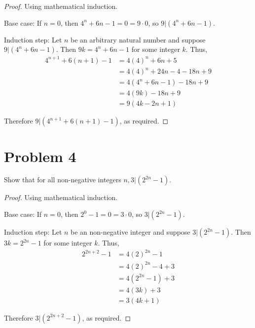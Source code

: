 \documentclass{article}
\begin{document}
    \begin{proof}
        Using mathematical induction.

        Base case: If $n=0$, then $4^n+6n-1 = 0 = 9\cdot 0$, so $9|(4^n+6n-1)$.

        Induction step: Let $n$ be an arbitrary natural number and suppose $9|(4^n+6n-1)$.
        Then $9k=4^n+6n-1$ for some integer $k$. Thus,
        \begin{equation*}
            \begin{split}
                4^{n+1}+6(n+1)-1 & = 4(4)^n+6n+5 \\
                & = 4(4)^n+24n-4-18n+9 \\
                & = 4(4^n+6n-1)-18n+9 \\
                & = 4(9k)-18n+9 \\
                & = 9(4k-2n+1)
            \end{split}
        \end{equation*}

        Therefore $9|(4^{n+1}+6(n+1)-1)$, as required.
    \end{proof}


    \section*{Problem 4}

    Show that for all non-negative integers $n, 3|(2^{2n}-1)$.

    \begin{proof}
        Using mathematical induction.

        Base case: If $n = 0$, then $2^0-1 = 0 = 3\cdot 0$, so $3|(2^{2n}-1)$.

        Induction step: Let $n$ be an non-negative integer and suppose $3|(2^{2n}-1)$.
        Then $3k=2^{2n}-1$ for some integer $k$. Thus,
        \begin{equation*}
            \begin{split}
                2^{2n+2}-1 & = 4(2)^{2n}-1 \\
                & = 4(2)^{2n}-4+3 \\ 
                & = 4(2^{2n}-1)+3 \\
                & = 4(3k)+3 \\
                & = 3(4k+1)
            \end{split}
        \end{equation*}
        
        Therefore $3|(2^{2n+2}-1)$, as required.
    \end{proof}
\end{document}
